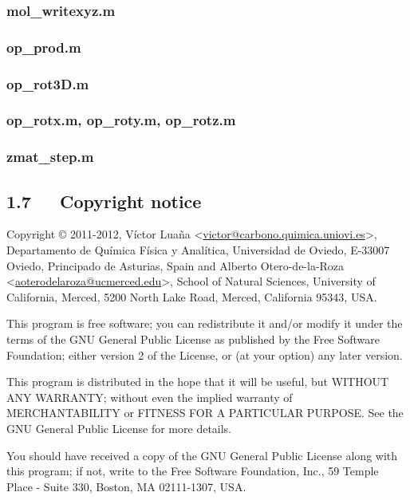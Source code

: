 \documentclass[a4paper]{article}
\begin{document}
\subsubsection{mol\_writexyz.m%
  \label{mol-writexyz-m}%
}


\subsubsection{op\_prod.m%
  \label{op-prod-m}%
}


\subsubsection{op\_rot3D.m%
  \label{op-rot3d-m}%
}


\subsubsection{op\_rotx.m, op\_roty.m, op\_rotz.m%
  \label{op-rotx-m-op-roty-m-op-rotz-m}%
}


\subsubsection{zmat\_step.m%
  \label{zmat-step-m}%
}


\subsection{1.7~~~Copyright notice%
  \label{copyright-notice}%
}

Copyright © 2011-2012, Víctor Luaña <\href{mailto:victor@carbono.quimica.uniovi.es}{victor@carbono.quimica.uniovi.es}>,
Departamento de Química Física y Analítica, Universidad de Oviedo,
E-33007 Oviedo, Principado de Asturias, Spain
and Alberto Otero-de-la-Roza <\href{mailto:aoterodelaroza@ucmerced.edu}{aoterodelaroza@ucmerced.edu}>, School of
Natural Sciences, University of California, Merced, 5200 North Lake Road,
Merced, California 95343, USA.

This program is free software; you can redistribute it and/or
modify it under the terms of the GNU General Public License
as published by the Free Software Foundation; either version 2
of the License, or (at your option) any later version.

This program is distributed in the hope that it will be useful,
but WITHOUT ANY WARRANTY; without even the implied warranty of
MERCHANTABILITY or FITNESS FOR A PARTICULAR PURPOSE.  See the
GNU General Public License for more details.

You should have received a copy of the GNU General Public License
along with this program; if not, write to the Free Software
Foundation, Inc., 59 Temple Place - Suite 330, Boston,
MA 02111-1307, USA.

\begin{thebibliography}{mw1}
\end{thebibliography}
\end{document}
